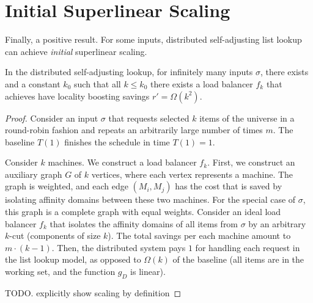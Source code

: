 \section{Initial Superlinear Scaling}

Finally, a positive result.
For some inputs, distributed self-adjusting list lookup can achieve \emph{initial} superlinear scaling.

\begin{observation}
	\label{obs:list-k2}
	In the distributed self-adjusting lookup, 
	for infinitely many inputs $\sigma$, there exists  and a constant $k_0$ such that all $k \le k_0$ there exists a load balancer $f_k$ that achieves have locality boosting savings $r' = \Omega(k^2)$.
\end{observation}

\begin{proof}
	Consider an input $\sigma$ that requests selected $k$ items of the universe in a round-robin fashion and repeats an arbitrarily large number of times $m$.
	The baseline $T(1)$ finishes the schedule in time $T(1) = 1$.

Consider $k$ machines. We construct a load balancer $f_k$.
First, we construct an auxiliary graph $G$ of $k$ vertices, where each vertex represents a machine. The graph is weighted, and each edge $(M_i, M_j)$ has the cost that is saved by isolating affinity domains between these two machines. For the special case of $\sigma$, this graph is a complete graph with equal weights.
Consider an ideal load balancer $f_k$ that isolates the affinity domains of all items from $\sigma$ by an arbitrary $k$-cut (components of size $k$)\cite{Frieze97, Mahajan95}. The total savings per each machine amount to $m\cdot(k-1)$.
Then, the distributed system pays $1$ for handling each request in the list lookup model, as opposed to $\Omega(k)$ of the baseline (all items are in the working set, and the function $g_D$ is linear).


TODO. explicitly show scaling by definition







\end{proof}


